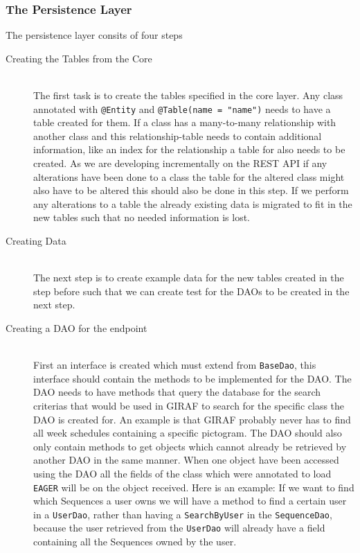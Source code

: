 \noindent
\subsubsection{The Persistence Layer}
The persistence layer consits of four steps

\begin{description}
	\item[Creating the Tables from the Core] \hfill \\
	The first task is to create the tables specified in the core layer.
	Any class annotated with \texttt{@Entity} and \texttt{@Table(name = "name")} needs to have a table created for them.
	If a class has a many-to-many relationship with another class and this relationship-table needs to contain additional information, like an index for the relationship a table for also needs to be created.
	As we are developing incrementally on the REST API if any alterations have been done to a class the table for the altered class might also have to be altered this should also be done in this step.
	If we perform any alterations to a table the already existing data is migrated to fit in the new tables such that no needed information is lost.
	\item[Creating Data] \hfill \\
	The next step is to create example data for the new tables created in the step before such that we can create test for the DAOs to be created in the next step.
	\item[Creating a DAO for the endpoint] \hfill \\
	First an interface is created which must extend from \texttt{BaseDao}, this interface should contain the methods to be implemented for the DAO.
	The DAO needs to have methods that query the database for the search criterias that would be used in GIRAF to search for the specific class the DAO is created for.
	An example is that GIRAF probably never has to find all week schedules containing a specific pictogram.
	The DAO should also only contain methods to get objects which cannot already be retrieved by another DAO in the same manner. 
	When one object have been accessed using the DAO all the fields of the class which were annotated to load \texttt{EAGER} will be on the object received.
	Here is an example: If we want to find which Sequences a user owns we will have a method to find a certain user in a \texttt{UserDao}, rather than having a \texttt{SearchByUser} in the \texttt{SequenceDao}, because the user retrieved from the \texttt{UserDao} will already have a field containing all the Sequences owned by the user.

\end{description}
